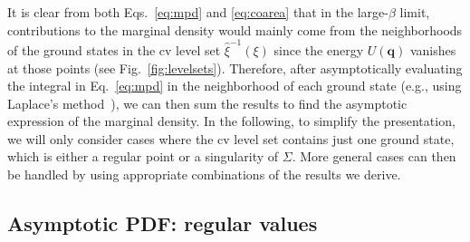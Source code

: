 It is clear from both Eqs.~\eqref{eq:mpd} and \eqref{eq:coarea} that in the large-$\beta$ limit, contributions to the marginal density would mainly come from the neighborhoods of the ground states in the \ac{cv} level set $\hat{\xi}^{-1}(\xi)$ since the energy $U(\bm{q})$ vanishes at those points (see Fig.~\ref{fig:levelsets}).
Therefore, after asymptotically evaluating the integral in Eq.~\eqref{eq:mpd} in the neighborhood of each ground state (e.g., using Laplace's method~\cite{breitung1994}), we can then sum the results to find the asymptotic expression of the marginal density.
In the following, to simplify the presentation, we will only consider cases where the \ac{cv} level set contains just one ground state, which is either a regular point or a singularity of $\Sigma$.
More general cases can then be handled by using appropriate combinations of the results we derive.

\subsection{Asymptotic PDF: regular values}
\label{sec:regular}

